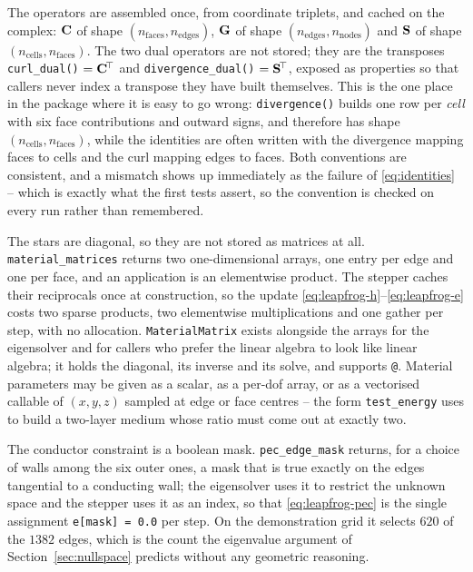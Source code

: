 The operators are assembled once, from coordinate triplets, and cached on the complex: $\mathbf{C}$ of shape
$(n_{\mathrm{faces}},n_{\mathrm{edges}})$, $\mathbf{G}$ of shape $(n_{\mathrm{edges}},n_{\mathrm{nodes}})$ and $\mathbf{S}$
of shape $(n_{\mathrm{cells}},n_{\mathrm{faces}})$. The two dual operators are not stored; they are the
transposes \texttt{curl\_dual()} $=\mathbf{C}^{\!\top}$ and \texttt{divergence\_dual()} $=\mathbf{S}^{\!\top}$, exposed as
properties so that callers never index a transpose they have built themselves. This is the one place in the
package where it is easy to go wrong: \texttt{divergence()} builds one row per \emph{cell} with six face
contributions and outward signs, and therefore has shape $(n_{\mathrm{cells}},n_{\mathrm{faces}})$, while the
identities are often written with the divergence mapping faces to cells and the curl mapping edges to faces. Both
conventions are consistent, and a mismatch shows up immediately as the failure of \eqref{eq:identities} -- which
is exactly what the first tests assert, so the convention is checked on every run rather than remembered.

The stars are diagonal, so they are not stored as matrices at all. \texttt{material\_matrices} returns two
one-dimensional arrays, one entry per edge and one per face, and an application is an elementwise product. The
stepper caches their reciprocals once at construction, so the update \eqref{eq:leapfrog-h}--\eqref{eq:leapfrog-e}
costs two sparse products, two elementwise multiplications and one gather per step, with no allocation.
\texttt{MaterialMatrix} exists alongside the arrays for the eigensolver and for callers who prefer the linear
algebra to look like linear algebra; it holds the diagonal, its inverse and its solve, and supports
\texttt{@}. Material parameters may be given as a scalar, as a per-dof array, or as a vectorised callable of
$(x,y,z)$ sampled at edge or face centres -- the form \texttt{test\_energy} uses to build a two-layer medium
whose ratio must come out at exactly two.

The conductor constraint is a boolean mask. \texttt{pec\_edge\_mask} returns, for a choice of walls among the six
outer ones, a mask that is true exactly on the edges tangential to a conducting wall; the eigensolver uses it to
restrict the unknown space and the stepper uses it as an index, so that \eqref{eq:leapfrog-pec} is the single
assignment \texttt{e[mask] = 0.0} per step. On the demonstration grid it selects $620$ of the $1382$ edges, which
is the count the eigenvalue argument of Section~\ref{sec:nullspace} predicts without any geometric reasoning.

